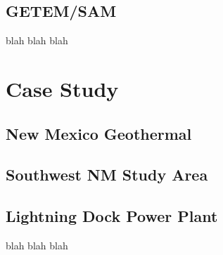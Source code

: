 \subsection{GETEM/SAM}
blah blah blah

\section{Case Study}\label{ch2:case}
\subsection{New Mexico Geothermal}
\subsection{Southwest NM Study Area}
\subsection{Lightning Dock Power Plant}
blah blah blah




%



